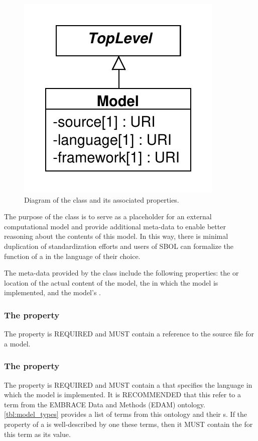 \begin{figure}[ht]
\begin{center}
\includegraphics[scale=0.6]{uml/model}
\caption[]{Diagram of the  class and its associated properties.}
\label{uml:model}
\end{center}
\end{figure}

The purpose of the  class is to serve as a placeholder for an external computational model and provide additional meta-data to enable better reasoning about the contents of this model.
In this way, there is minimal duplication of standardization efforts and users of SBOL can formalize the function of a  in the language of their choice.

The meta-data provided by the  class include the following properties: the  or location of the actual content of the model, the  in which the model is implemented, and the model's .

\subsubsection*{ The  property}\label{sec:source:M}
The  property is REQUIRED and MUST contain a  reference to the source file for a model.

\subsubsection*{ The  property}\label{sec:language}
The  property is REQUIRED and MUST contain a  that specifies the language in which the model is implemented. It is RECOMMENDED that this  refer to a term from the EMBRACE Data and Methods (EDAM) ontology. \ref{tbl:model_types} provides a list of terms from this ontology and their s. If the  property of a  is well-described by one these terms, then it MUST contain the  for this term as its value.

